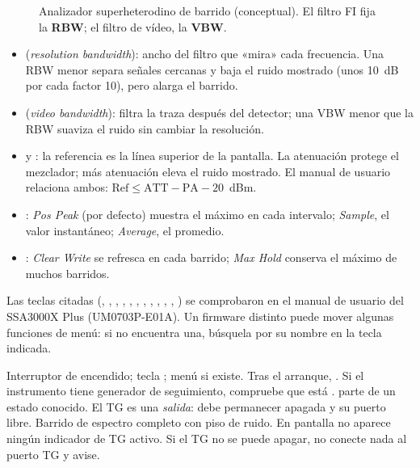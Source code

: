 \begin{figure}[H]
\centering
\resizebox{\linewidth}{!}{}
\caption{Analizador superheterodino de barrido (conceptual). El filtro FI fija la \textbf{RBW}; el filtro de vídeo, la \textbf{VBW}.}
\label{fig:analizador}
\end{figure}

\begin{itemize}
  \item {} (\emph{resolution bandwidth}): ancho del filtro que «mira» cada frecuencia. Una RBW menor separa señales cercanas y baja el ruido mostrado (unos 10~dB por cada factor 10), pero alarga el barrido.
  \item {} (\emph{video bandwidth}): filtra la traza después del detector; una VBW menor que la RBW suaviza el ruido sin cambiar la resolución.
  \item {} y : la referencia es la línea superior de la pantalla. La atenuación protege el mezclador; más atenuación eleva el ruido mostrado. El manual de usuario relaciona ambos: $\text{Ref} \le \text{ATT} - \text{PA} - 20$~dBm.
  \item {}: \emph{Pos Peak} (por defecto) muestra el máximo en cada intervalo; \emph{Sample}, el valor instantáneo; \emph{Average}, el promedio.
  \item {}: \emph{Clear Write} se refresca en cada barrido; \emph{Max Hold} conserva el máximo de muchos barridos.
\end{itemize}

\begin{nota}
Las teclas citadas (, , , , , , , , , , , ) se comprobaron en el manual de usuario del SSA3000X Plus (UM0703P-E01A). Un firmware distinto puede mover algunas funciones de menú: si no encuentra una, búsquela por su nombre en la tecla indicada.
\end{nota}

{Interruptor de encendido; tecla ; menú  si existe.}
{Tras el arranque, . Si el instrumento tiene generador de seguimiento, compruebe que está .}
{ parte de un estado conocido. El TG es una \emph{salida}: debe permanecer apagada y su puerto libre.}
{Barrido de espectro completo con piso de ruido.}
{En pantalla no aparece ningún indicador de TG activo.}
{Si el TG no se puede apagar, no conecte nada al puerto TG y avise.}

